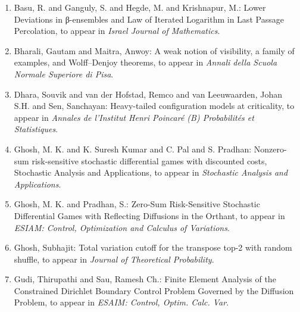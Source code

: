 \medskip


\vspace{-2.5mm}

\begin{enumerate}[resume, leftmargin=27pt]
	\item Basu, R. and Ganguly, S. and Hegde, M. and Krishnapur, M.: Lower Deviations in β-ensembles and Law of Iterated Logarithm in Last Passage Percolation, to appear in \emph{Israel Journal of Mathematics}.

	\item\label{bharali:Wolff-Denjoy} Bharali, Gautam and Maitra, Anwoy: A weak notion of visibility,
	      a family of examples, and Wolff--Denjoy theorems, to appear in \emph{Annali della Scuola Normale Superiore di Pisa}.

	\item\label{sen:models-at-criticality} Dhara, Souvik and van der Hofstad, Remco and van Leeuwaarden, Johan S.H. and Sen, Sanchayan: Heavy-tailed configuration models at criticality, to appear in {\em Annales de l'Institut Henri
			      Poincar\'e (B) Probabilit\'es et Statistiques}.

	\item Ghosh, M. K. and K. Suresh Kumar and C. Pal and S. Pradhan: Nonzero-sum risk-sensitive stochastic differential games with discounted costs, Stochastic Analysis and Applications, to appear in \emph{Stochastic Analysis and Applications}.

	\item Ghosh, M. K. and Pradhan, S.: Zero-Sum Risk-Sensitive Stochastic Differential Games with Reflecting Diffusions in the Orthant, to appear in \emph{ESIAM: Control, Optimization and Calculus of Variations}.

	\item Ghosh, Subhajit: Total variation cutoff for the transpose top-2 with random shuffle, to appear in {\em Journal of Theoretical Probability}.

	\item Gudi, Thirupathi and  Sau, Ramesh Ch.: Finite Element Analysis of the Constrained Dirichlet Boundary Control Problem Governed by the Diffusion Problem, to appear in \emph{ESAIM: Control, Optim. Calc. Var}.


\end{enumerate}

